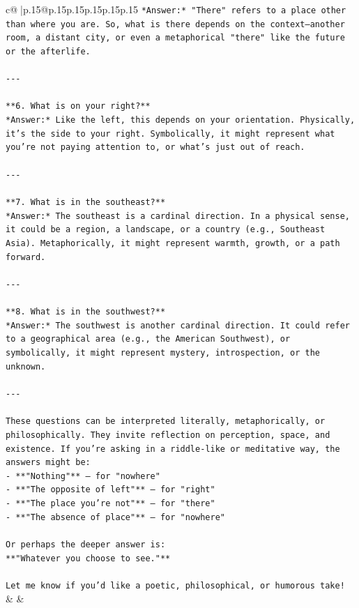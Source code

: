 \documentclass{article}
\begin{document}
{\begin{supertabular}{c@{$\;$}|p{.15\linewidth}@{}p{.15\linewidth}p{.15\linewidth}p{.15\linewidth}p{.15\linewidth}p{.15\linewidth}}
{{{\texttt{*Answer:* "There" refers to a place other than where you are. So, what is there depends on the context—another room, a distant city, or even a metaphorical "there" like the future or the afterlife.} \\
\\ 
\texttt{{-}{-}{-}} \\
\\ 
\texttt{**6. What is on your right?**  } \\
\texttt{*Answer:* Like the left, this depends on your orientation. Physically, it's the side to your right. Symbolically, it might represent what you're not paying attention to, or what's just out of reach.} \\
\\ 
\texttt{{-}{-}{-}} \\
\\ 
\texttt{**7. What is in the southeast?**  } \\
\texttt{*Answer:* The southeast is a cardinal direction. In a physical sense, it could be a region, a landscape, or a country (e.g., Southeast Asia). Metaphorically, it might represent warmth, growth, or a path forward.} \\
\\ 
\texttt{{-}{-}{-}} \\
\\ 
\texttt{**8. What is in the southwest?**  } \\
\texttt{*Answer:* The southwest is another cardinal direction. It could refer to a geographical area (e.g., the American Southwest), or symbolically, it might represent mystery, introspection, or the unknown.} \\
\\ 
\texttt{{-}{-}{-}} \\
\\ 
\texttt{These questions can be interpreted literally, metaphorically, or philosophically. They invite reflection on perception, space, and existence. If you're asking in a riddle{-}like or meditative way, the answers might be:  } \\
\texttt{{-} **"Nothing"** — for "nowhere"  } \\
\texttt{{-} **"The opposite of left"** — for "right"  } \\
\texttt{{-} **"The place you're not"** — for "there"  } \\
\texttt{{-} **"The absence of place"** — for "nowhere"} \\
\\ 
\texttt{Or perhaps the deeper answer is:  } \\
\texttt{**"Whatever you choose to see."**  } \\
\\ 
\texttt{Let me know if you'd like a poetic, philosophical, or humorous take!} \\
            }
        }
    }
    & & \\ \\


\end{supertabular}}
\end{document}
